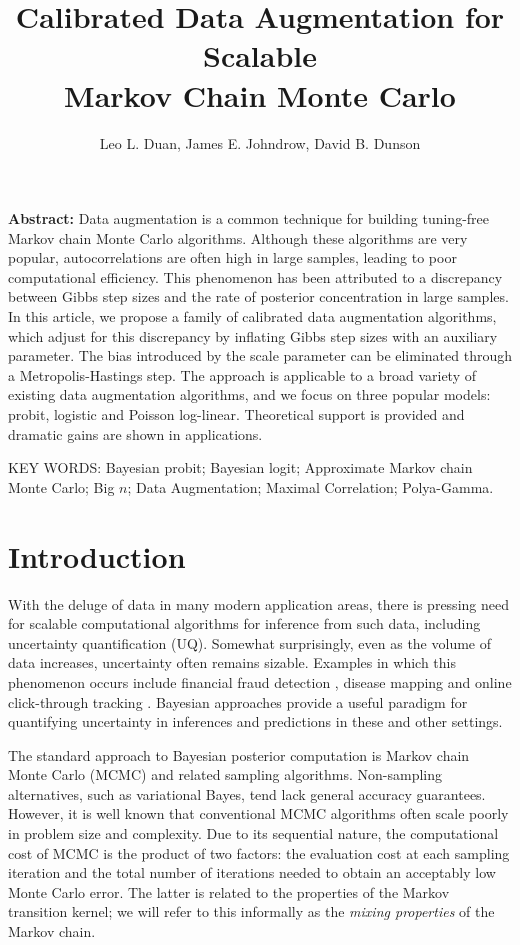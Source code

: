 \documentclass[10pt]{article}
\title
{{Calibrated Data Augmentation for Scalable \\ Markov Chain Monte Carlo}}
\author{
     Leo L. Duan,
     James E. Johndrow,
     David B. Dunson
}
\begin{document}
    
\maketitle

{\bf Abstract:} Data augmentation is a common technique for building tuning-free Markov chain Monte Carlo algorithms. Although these algorithms are very popular, 
autocorrelations are often high in large samples, leading to poor computational efficiency.  This phenomenon has been attributed to a discrepancy between Gibbs step sizes and the rate of posterior concentration in large samples.  In this article, we propose a family of calibrated data augmentation algorithms, which adjust for this discrepancy by inflating Gibbs step sizes with an auxiliary parameter. The bias introduced by the scale parameter can be eliminated through a Metropolis-Hastings step. The approach is applicable to a broad variety of existing data augmentation algorithms, and we focus on three popular models: probit, logistic and Poisson log-linear.  Theoretical support is provided and dramatic gains are shown in applications.
\vskip 12pt

{\noindent  KEY WORDS:  Bayesian probit; Bayesian logit; Approximate Markov chain Monte Carlo; Big $n$; Data Augmentation; Maximal Correlation; Polya-Gamma.}
{}

\section{Introduction}

With the deluge of data in many modern application areas, there is pressing need for scalable computational algorithms for inference from such data, including uncertainty quantification (UQ).  Somewhat surprisingly, even as the volume of data increases, uncertainty often remains sizable.  Examples in which this phenomenon occurs include financial fraud detection \citep{ngai2011application}, disease mapping \citep{wakefield2007disease} and online click-through tracking \citep{wang2010click}.  Bayesian approaches provide a useful paradigm for quantifying uncertainty in inferences and predictions in these and other settings.

The standard approach to Bayesian posterior computation is Markov chain Monte Carlo (MCMC) and related sampling algorithms. Non-sampling alternatives, such as variational Bayes, tend lack general accuracy guarantees. However, it is well known that conventional MCMC algorithms often scale poorly in problem size and complexity. Due to its sequential nature, the computational cost of MCMC is the product of two factors: the evaluation cost at each sampling iteration and the total number of iterations needed to obtain an acceptably low Monte Carlo error. The latter is related to the properties of the Markov transition kernel; we will refer to this informally as the \emph{mixing properties} of the Markov chain. 
\end{document}
